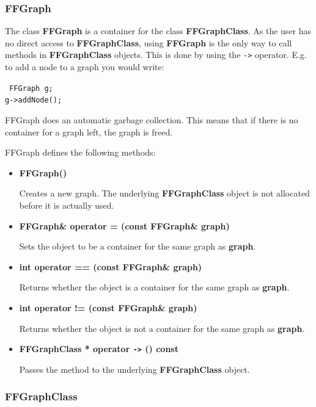 
\subsubsection{FFGraph}

The class {\bf FFGraph} is a container for the class {\bf
  FFGraphClass}. As the user has no direct access to {\bf
  FFGraphClass}, using {\bf FFGraph} is the only way to call
methods in {\bf FFGraphClass} objects. This is done by using the
\verb|->| operator. E.g. to add a node to a graph you would write:

\bigskip

{\tt
FFGraph g;\\
g\verb|->|addNode();\\
}

\bigskip

FFGraph does an automatic garbage collection. This means that if
there is no container for a graph left, the graph is freed.

FFGraph defines the following methods:

\begin{itemize}

\item{\bf FFGraph()}
  
  Creates a new graph. The underlying {\bf FFGraphClass} object
  is not allocated before it is actually used.

\item{\bf FFGraph\& operator = (const FFGraph\& graph)}
  
  Sets the object to be a container for the same graph as {\bf
    graph}.

\item{\bf int operator == (const FFGraph\& graph)}
  
  Returns whether the object is a container for the same graph as
  {\bf graph}.

\item{\bf int operator != (const FFGraph\& graph)}
  
  Returns whether the object is not a container for the same
  graph as {\bf graph}.
  
\item{\bf FFGraphClass * operator \verb|->| () const}
  
  Passes the method to the underlying {\bf FFGraphClass} object.

\end{itemize}

\subsubsection{FFGraphClass}

